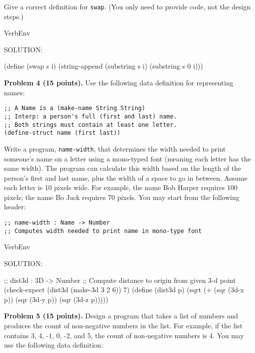 \documentclass[12pt]{article}
\begin{document}
\noindent
Give a correct definition for \verb|swap|.  (You only need to
provide code, not the design steps.)

\begin{SaveVerbatim}{VerbEnv}

SOLUTION:

(define (swap s i)
  (string-append (substring s i)
                 (substring s 0 i)))
\end{SaveVerbatim}




\newpage 
\noindent
{\bf Problem 4 (15 points).}
%
Use the following data definition for representing names:
\begin{verbatim}
;; A Name is a (make-name String String)
;; Interp: a person's full (first and last) name.
;; Both strings must contain at least one letter.
(define-struct name (first last))
\end{verbatim}

\noindent
Write a program, \verb|name-width|, that determines the width needed
to print someone's name on a letter using a mono-typed font (meaning
each letter has the same width).  The program can calculate this width
based on the length of the person's first and last name, plus the
width of a space to go in between.  Assume each letter is 10 pixels
wide.  For example, the name Bob Harper requires 100 pixels; the name
Bo Jack requires 70 pixels.  You may start from the following header:

\begin{verbatim}
;; name-width : Name -> Number
;; Computes width needed to print name in mono-type font
\end{verbatim}

\begin{SaveVerbatim}{VerbEnv}

SOLUTION:
  
;; dist3d : 3D -> Number
;; Compute distance to origin from given 3-d point
(check-expect (dist3d (make-3d 3 2 6)) 7)
(define (dist3d p)
  (sqrt (+ (sqr (3d-x p)) (sqr (3d-y p)) (sqr (3d-z p)))))  
\end{SaveVerbatim}



\newpage
\noindent
{\bf Problem 5 (15 points).}  
%
Design a program that takes a list of numbers and produces the count
of non-negative numbers in the list.  For example, if the list
contains 3, 4, -1, 0, -2, and 5, the count of non-negative numbers is
4.  You may use the following data definition:
\end{document}

